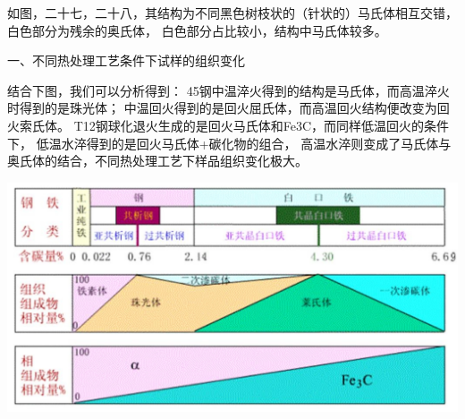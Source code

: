 \documentclass[a4paper,utf8]{article}
\begin{document}
如图，二十七，二十八，其结构为不同黑色树枝状的（针状的）马氏体相互交错，白色部分为残余的奥氏体，
白色部分占比较小，结构中马氏体较多。
\begin{figure}[!ht]
    \begin{floatrow}
            
    \end{floatrow}

\end{figure}



一、不同热处理工艺条件下试样的组织变化

结合下图，我们可以分析得到：
45钢中温淬火得到的结构是马氏体，而高温淬火时得到的是珠光体；
中温回火得到的是回火屈氏体，而高温回火结构便改变为回火索氏体。
T12钢球化退火生成的是回火马氏体和Fe3C，而同样低温回火的条件下，
低温水淬得到的是回火马氏体+碳化物的组合，
高温水淬则变成了马氏体与奥氏体的结合，不同热处理工艺下样品组织变化极大。

\begin{center}
    \includegraphics[width=400pt]{3.png} 
\end{center}
\end{document}
